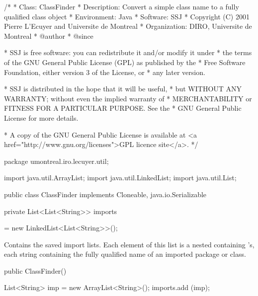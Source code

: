 \begin{code}\begin{hide}
/*
 * Class:        ClassFinder
 * Description:  Convert a simple class name to a fully qualified class object
 * Environment:  Java
 * Software:     SSJ 
 * Copyright (C) 2001  Pierre L'Ecuyer and Universite de Montreal
 * Organization: DIRO, Universite de Montreal
 * @author       
 * @since

 * SSJ is free software: you can redistribute it and/or modify it under
 * the terms of the GNU General Public License (GPL) as published by the
 * Free Software Foundation, either version 3 of the License, or
 * any later version.

 * SSJ is distributed in the hope that it will be useful,
 * but WITHOUT ANY WARRANTY; without even the implied warranty of
 * MERCHANTABILITY or FITNESS FOR A PARTICULAR PURPOSE.  See the
 * GNU General Public License for more details.

 * A copy of the GNU General Public License is available at
   <a href="http://www.gnu.org/licenses">GPL licence site</a>.
 */
\end{hide}
package umontreal.iro.lecuyer.util;\begin{hide}

import java.util.ArrayList;
import java.util.LinkedList;
import java.util.List;
\end{hide}


public class ClassFinder implements Cloneable, java.io.Serializable\begin{hide} {
   private static final long serialVersionUID = -4847630831331065792L;
\end{hide}

   private List<List<String>> imports\begin{hide} = new LinkedList<List<String>>();
\end{hide}
\end{code}
\begin{tabb}   Contains the saved import lists.
 Each element of this list is a nested  containing
 's, each string containing the fully qualified
 name of an imported package or class.
\end{tabb}
\begin{htmlonly}
\end{htmlonly}
\begin{code}

   public ClassFinder()\begin{hide} {
      List<String> imp = new ArrayList<String>();
      imports.add (imp);
   }\end{hide}
\end{code}
